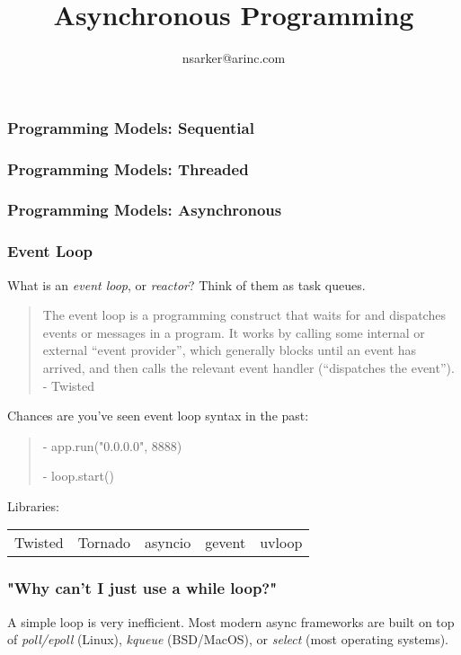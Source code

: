\documentclass{beamer}
\author{nsarker@arinc.com}
\title{Asynchronous Programming}
\date{}
\begin{document}
\small

\begin{frame}
    \titlepage
\end{frame}


\begin{frame}
\frametitle{Programming Models: Sequential}
\end{frame}


\begin{frame}
\frametitle{Programming Models: Threaded}
\end{frame}


\begin{frame}
\frametitle{Programming Models: Asynchronous}
\end{frame}


\begin{frame}
\frametitle{Event Loop}
What is an \textit{event loop}, or \textit{reactor}? Think of them as task queues.

\begin{quote}
    The event loop is a programming construct that waits for and dispatches events or messages in a program. It works by calling some internal or external “event provider”, which generally blocks until an event has arrived, and then calls the relevant event handler (“dispatches the event”). - Twisted
\end{quote}

Chances are you've seen event loop syntax in the past:
\begin{quote}
    \begin{semiverbatim}
    - app.run("0.0.0.0", 8888)

    - loop.start()
    \end{semiverbatim}
\end{quote}

Libraries:

\begin{tabular}{l l l l l}
    Twisted & Tornado & asyncio & gevent & uvloop
\end{tabular}

\end{frame}


\begin{frame}
\frametitle{"Why can't I just use a while loop?"}
A simple loop is very inefficient. Most modern async frameworks are built on top of \textit{poll/epoll} (Linux), \textit{kqueue} (BSD/MacOS), or \textit{select} (most operating systems).
\end{frame}
\end{document}
